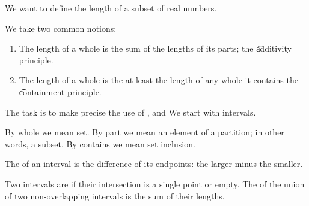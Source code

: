 

We want to define the length of a subset of real numbers.


We take two common notions:

\begin{enumerate}

  \item
  The length of a whole
  is the sum of the lengths
  of its parts;
  the \t{additivity principle}.

  \item
  The length of a whole
  is the at least the length
  of any whole it contains
  the \t{containment principle}.

\end{enumerate}

The task is to make precise
the use of
,
and 
We start with intervals.


By whole we mean set.
By part we mean an element of a partition; in other words, a subset.
By contains we mean set inclusion.

The
of an interval is the difference
of its endpoints: the larger minus
the smaller.

Two intervals are
if their intersection
is a single point or empty.
The  of the union of
two non-overlapping intervals is
the sum of their lengths.

